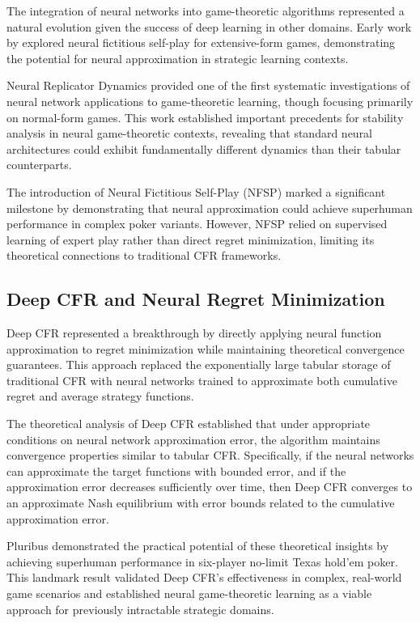 \documentclass[10pt,twocolumn]{article}
\theoremstyle{definition}
\begin{document}
The integration of neural networks into game-theoretic algorithms represented a natural evolution given the success of deep learning in other domains. Early work by \citet{heinrich2015fictitious} explored neural fictitious self-play for extensive-form games, demonstrating the potential for neural approximation in strategic learning contexts.

Neural Replicator Dynamics \citep{muller2019shared} provided one of the first systematic investigations of neural network applications to game-theoretic learning, though focusing primarily on normal-form games. This work established important precedents for stability analysis in neural game-theoretic contexts, revealing that standard neural architectures could exhibit fundamentally different dynamics than their tabular counterparts.

The introduction of Neural Fictitious Self-Play (NFSP) \citep{heinrich2016deep} marked a significant milestone by demonstrating that neural approximation could achieve superhuman performance in complex poker variants. However, NFSP relied on supervised learning of expert play rather than direct regret minimization, limiting its theoretical connections to traditional CFR frameworks.

\subsection{Deep CFR and Neural Regret Minimization}

Deep CFR \citep{brown2019deep} represented a breakthrough by directly applying neural function approximation to regret minimization while maintaining theoretical convergence guarantees. This approach replaced the exponentially large tabular storage of traditional CFR with neural networks trained to approximate both cumulative regret and average strategy functions.

The theoretical analysis of Deep CFR established that under appropriate conditions on neural network approximation error, the algorithm maintains convergence properties similar to tabular CFR. Specifically, if the neural networks can approximate the target functions with bounded error, and if the approximation error decreases sufficiently over time, then Deep CFR converges to an approximate Nash equilibrium with error bounds related to the cumulative approximation error.

Pluribus \citep{brown2019superhuman} demonstrated the practical potential of these theoretical insights by achieving superhuman performance in six-player no-limit Texas hold'em poker. This landmark result validated Deep CFR's effectiveness in complex, real-world game scenarios and established neural game-theoretic learning as a viable approach for previously intractable strategic domains.
\end{document}
